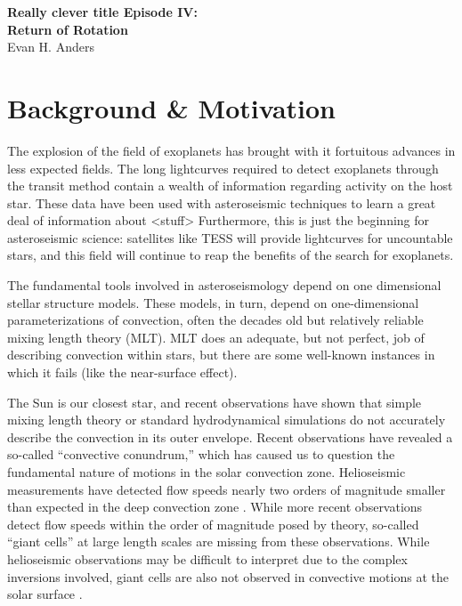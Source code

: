\documentclass[aasms,12pt]{article}
\begin{document}
\begin{center}
   \large\textbf{Really clever title Episode IV:}\\
   \large\textbf{Return of Rotation}\\
   \vspace{0.2cm}
   \large{Evan H. Anders}\\
   \vspace{0.2cm}
\end{center}

\vspace{-0.6cm}

\section{Background \& Motivation}
The explosion of the field of exoplanets has brought with it fortuitous advances in less expected fields.
The long lightcurves required to detect exoplanets through the transit method contain a wealth of information regarding activity on the host star.
These data have been used with asteroseismic techniques to learn a great deal of information about <stuff>
Furthermore, this is just the beginning for asteroseismic science: satellites like TESS will provide lightcurves for uncountable stars, and this field will continue to reap the benefits of the search for exoplanets.

The fundamental tools involved in asteroseismology depend on one dimensional stellar structure models.
These models, in turn, depend on one-dimensional parameterizations of convection, often the decades old but relatively reliable mixing length theory (MLT).
MLT does an adequate, but not perfect, job of describing convection within stars, but there are some well-known instances in which it fails (like the near-surface effect).

The Sun is our closest star, and recent observations have shown that simple mixing length theory or standard hydrodynamical simulations do not accurately describe the convection in its outer envelope.
Recent observations have revealed a so-called ``convective conundrum,'' which has caused us to question the fundamental nature of motions in the solar convection zone.
Helioseismic measurements have detected flow speeds nearly two orders of magnitude smaller than expected in the deep convection zone \citep{hanasoge&all2012}.
While more recent observations \citep{greer&all2015} detect flow speeds within the order of magnitude posed by theory, so-called ``giant cells'' at large length scales are missing from these observations.
While helioseismic observations may be difficult to interpret due to the complex inversions involved, giant cells are also not observed in convective motions at the solar surface \citep{hathaway&all2015}.
\end{document}
